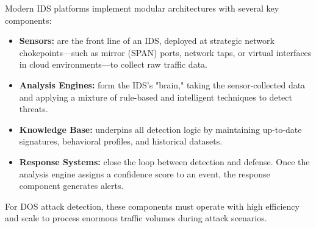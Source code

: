 \documentclass[12pt]{report}
\begin{document}
Modern IDS platforms implement modular architectures with several key components:
\begin{itemize}
    \item \textbf{Sensors:} are the front line of an IDS, deployed at strategic network chokepoints—such as mirror (SPAN) ports, network taps, or virtual interfaces in cloud environments—to collect raw traffic data.
    \item \textbf{Analysis Engines:} form the IDS's "brain," taking the sensor-collected data and applying a mixture of rule-based and intelligent techniques to detect threats.
    \item \textbf{Knowledge Base:} underpins all detection logic by maintaining up-to-date signatures, behavioral profiles, and historical datasets.
    \item \textbf{Response Systems:} close the loop between detection and defense. Once the analysis engine assigns a confidence score to an event, the response component generates alerts.
\end{itemize}
For DOS attack detection, these components must operate with high efficiency and scale to process enormous traffic volumes during attack scenarios.
\end{document}
